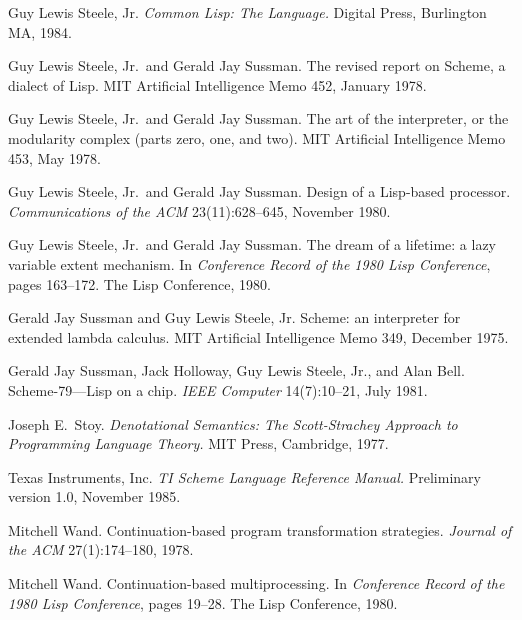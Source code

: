 \begin{thebibliography}{99}
Guy Lewis Steele, Jr.
{\em Common Lisp: The Language.}
Digital Press, Burlington MA, 1984.

Guy Lewis Steele, Jr.~and Gerald Jay Sussman.
The revised report on Scheme, a dialect of Lisp.
MIT Artificial Intelligence Memo 452, January 1978.

Guy Lewis Steele, Jr.~and Gerald Jay Sussman.
The art of the interpreter, or the modularity complex (parts zero, one,
  and two).
MIT Artificial Intelligence Memo 453, May 1978.

Guy Lewis Steele, Jr.~and Gerald Jay Sussman.
Design of a Lisp-based processor.
{\em Communications of the ACM} 23(11):628--645, November 1980.

Guy Lewis Steele, Jr.~and Gerald Jay Sussman.
The dream of a lifetime: a lazy variable extent mechanism.
In {\em Conference Record of the 1980 Lisp Conference}, pages 163--172.
The Lisp Conference, 1980.

Gerald Jay Sussman and Guy Lewis Steele, Jr.
Scheme: an interpreter for extended lambda calculus.
MIT Artificial Intelligence Memo 349, December 1975.

Gerald Jay Sussman, Jack Holloway, Guy Lewis Steele, Jr., and Alan Bell.
Scheme-79---Lisp on a chip.
{\em IEEE Computer} 14(7):10--21, July 1981.

Joseph E.~Stoy.
{\em Denotational Semantics: The Scott-Strachey Approach to
  Programming Language Theory.}
MIT Press, Cambridge, 1977.

Texas Instruments, Inc.
{\em TI Scheme Language Reference Manual.}
Preliminary version 1.0, November 1985.

Mitchell Wand.
Continuation-based program transformation strategies.
{\em Journal of the ACM} 27(1):174--180, 1978.

Mitchell Wand.
Continuation-based multiprocessing.
In {\em Conference Re\-cord of the 1980 Lisp Conference}, pages 19--28.
The Lisp Conference, 1980.

\end{thebibliography}
